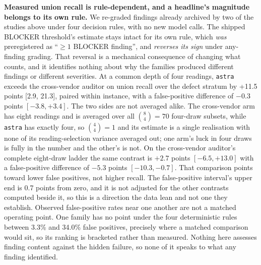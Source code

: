 \textbf{Measured union recall is rule-dependent, and a headline's magnitude belongs to its own
rule.} We re-graded findings already archived by two of the studies above under four decision
rules, with no new model calls. The shipped BLOCKER threshold's estimate stays intact for its own
rule, which \emph{was} preregistered as ``$\geq 1$ BLOCKER finding'', and \emph{reverses its
sign} under any-finding grading. That reversal is a mechanical consequence of changing what
counts, and it identifies nothing about why the families produced different findings or
different severities. At a common depth of four readings, \texttt{astra} exceeds the
cross-vendor auditor on union recall over the defect stratum by +11.5 points [2.9, 21.3], paired within instance, with a false-positive difference of $-0.3$ points
$[-3.8, +3.4]$. The two sides are not averaged alike. The cross-vendor arm has eight readings and
is averaged over all $\binom{8}{4}=70$ four-draw subsets, while \texttt{astra} has exactly four,
so $\binom{4}{4}=1$ and its estimate is a single realisation with none of its reading-selection
variance averaged out; one arm's luck in four draws is fully in the number and the other's is not.
On the cross-vendor auditor's complete eight-draw ladder the same contrast is $+2.7$ points
$[-6.5, +13.0]$ with a false-positive difference of $-5.3$ points $[-10.3, -0.7]$. That
comparison points toward lower false positives, not higher recall. The false-positive interval's
upper end is 0.7 points from zero, and it is not adjusted for the other contrasts computed beside
it, so this is a direction the data lean and not one they establish. Observed false-positive rates
near one another are not a matched operating point. One family has no point under the four
deterministic rules between 3.3\% and 34.0\% false positives, precisely where a matched comparison
would sit, so its ranking is bracketed rather than measured. Nothing here assesses finding content
against the hidden failure, so none of it speaks to what any finding identified.

